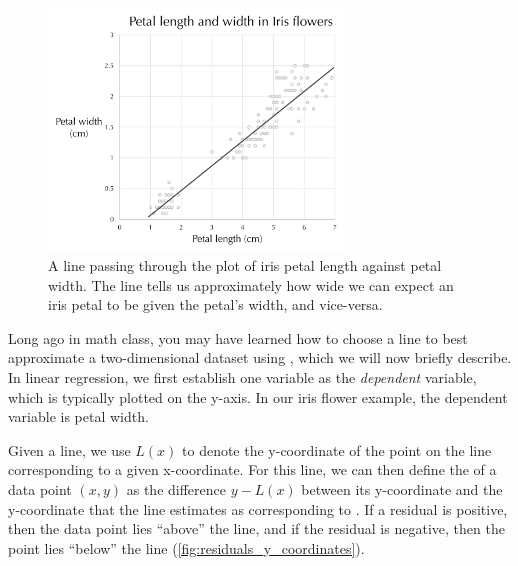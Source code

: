 \begin{figure}[h]
\centering
\mySfFamily
\includegraphics[width = 0.7\textwidth]{../images/iris_flowers_regression_line.png}
\caption{A line passing through the plot of iris petal length against petal width. The line tells us approximately how wide we can expect an iris petal to be given the petal's width, and vice-versa.}
\label{fig:iris_flowers_regression_line}
\end{figure}

\begin{qbox}\end{qbox}

Long ago in math class, you may have learned how to choose a line to best approximate a two-dimensional dataset using , which we will now briefly describe. In linear regression, we first establish one variable as the \textit{dependent} variable, which is typically plotted on the y-axis. In our iris flower example, the dependent variable is petal width.

Given a line, we use $L(x)$ to denote the y-coordinate of the point on the line corresponding to a given x-coordinate. For this line, we can then define the  of a data point $(x, y)$ as the difference $y - L(x)$ between its y-coordinate and the y-coordinate that the line estimates as corresponding to . If a residual is positive, then the data point lies ``above'' the line, and if the residual is negative, then the point lies ``below'' the line (\autoref{fig:residuals_y_coordinates}).\\

